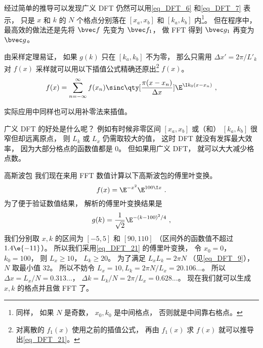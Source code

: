 经过简单的推导可以发现广义 DFT 仍然可以用\autoref{eq_DFT_6} 和\autoref{eq_DFT_7} 表示， 只是 $x$ 和 $k$ 的 $N$ 个格点分别落在 $[x_a, x_b]$ 和 $[k_a, k_b]$ 内\footnote{同样， 如果 $N$ 是奇数， $x_0, k_0$ 是中间格点， 否则就是中间靠右格点。}。 但在程序中， 最高效的做法还是先将 $\bvec f$ 先变为 $\bvec f_1$， 做 FFT 得到 $\bvec g_1$ 再变为 $\bvec g$。

由采样定理易证， 如果 $g(k)$ 只在 $[k_a, k_b]$ 不为零， 那么只需用 $\Delta x' = 2\pi/L'_k$ 对 $f(x)$ 采样就可以用以下插值公式精确还原出\footnote{对离散的 $f_1(x)$ 使用之前的插值公式， 再由 $f_1(x)$ 求 $f(x)$ 就可以推导出\autoref{eq_DFT_21}。} $f(x)$。
\begin{equation}\label{eq_DFT_21}
f(x) = \sum_{n = -\infty}^{\infty} f(x_n)\sinc\qty[\frac{\pi(x - x_n)}{\Delta x}] \E^{\I k_0 (x-x_n)}~,
\end{equation}

实际应用中同样也可以用补零法来插值。

广义 DFT 的好处是什么呢？ 例如有时候非零区间 $[x_a, x_b]$ 或（和） $[k_a, k_b]$ 很窄但却远离原点， 则 $L_k$ 或 $L_x$ 仍需取较大的值， 这时 DFT 就没有发挥最大效率， 因为大部分格点的函数值都是 0。 但如果用广义 DFT， 就可以大大减少格点数。

\begin{example}{高斯波包}
我们现在来用 FFT 数值计算以下高斯波包的傅里叶变换。
\begin{equation}
f(x) = \E^{-x^2}\E^{100 \I x}~.
\end{equation}
为了便于验证数值结果， 解析的傅里叶变换结果是%
\begin{equation}
g(k) = \frac{1}{\sqrt2}\E^{-(k-100)^2/4}~,
\end{equation}
我们分别取 $x, k$ 的区间为 $[-5, 5]$ 和 $[90, 110]$ （区间外的函数值不超过 $1.4\e{-11}$）。 所以我们采用\autoref{eq_DFT_21} 的傅里叶变换， 令 $x_0 = 0$， $k_0 = 100$， 则 $L_x \geqslant 10$， $L_k \geqslant 20$。 为了满足 $L_x L_k = 2\pi N$ （见\autoref{eq_DFT_9}）， $N$ 取最小值 32。 所以不妨令 $L_x = 10, L_k = 2\pi N/L_x = 20.106...$。
所以 $\Delta x = L_x/N = 0.313...$， $\Delta k = L_k/N = 2\pi/L_x = 0.628...$。 现在我们就可以生成 $x, k$ 的格点并且做 FFT 了。
\end{example}
